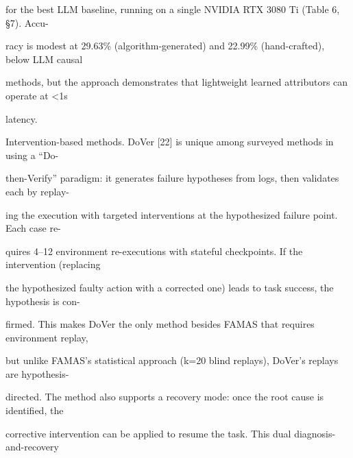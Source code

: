 \begin{flushleft}
\noindent for the best LLM baseline, running on a single NVIDIA RTX 3080 Ti (Table 6, §7). Accu-\par
\noindent racy is modest at 29.63\% (algorithm-generated) and 22.99\% (hand-crafted), below LLM causal\par
\noindent methods, but the approach demonstrates that lightweight learned attributors can operate at <1s\par
\noindent latency.\par
\par\smallskip
\noindent Intervention-based methods. DoVer [22] is unique among surveyed methods in using a “Do-\par
\noindent then-Verify” paradigm: it generates failure hypotheses from logs, then validates each by replay-\par
\noindent ing the execution with targeted interventions at the hypothesized failure point. Each case re-\par
\noindent quires 4–12 environment re-executions with stateful checkpoints. If the intervention (replacing\par
\noindent the hypothesized faulty action with a corrected one) leads to task success, the hypothesis is con-\par
\noindent firmed. This makes DoVer the only method besides FAMAS that requires environment replay,\par
\noindent but unlike FAMAS’s statistical approach (k=20 blind replays), DoVer’s replays are hypothesis-\par
\noindent directed. The method also supports a recovery mode: once the root cause is identified, the\par
\noindent corrective intervention can be applied to resume the task. This dual diagnosis-and-recovery\par
\end{flushleft}
